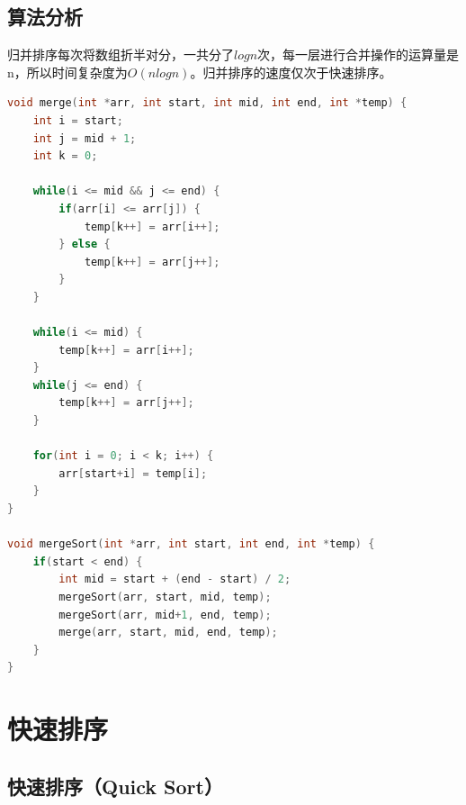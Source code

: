 \subsection{算法分析}

归并排序每次将数组折半对分，一共分了$ logn $次，每一层进行合并操作的运算量是n，所以时间复杂度为$ O(nlogn) $。归并排序的速度仅次于快速排序。 \\

\begin{table}[H]
    \centering
    \caption{归并排序算法分析}
\end{table}


\begin{lstlisting}[language=C]
void merge(int *arr, int start, int mid, int end, int *temp) {
    int i = start;
    int j = mid + 1;
    int k = 0;

    while(i <= mid && j <= end) {
        if(arr[i] <= arr[j]) {
            temp[k++] = arr[i++];
        } else {
            temp[k++] = arr[j++];
        }
    }

    while(i <= mid) {
        temp[k++] = arr[i++];
    }
    while(j <= end) {
        temp[k++] = arr[j++];
    }

    for(int i = 0; i < k; i++) {
        arr[start+i] = temp[i];
    }
}

void mergeSort(int *arr, int start, int end, int *temp) {
    if(start < end) {
        int mid = start + (end - start) / 2;
        mergeSort(arr, start, mid, temp);
        mergeSort(arr, mid+1, end, temp);
        merge(arr, start, mid, end, temp);
    }
}
\end{lstlisting}

\newpage

\section{快速排序}

\subsection{快速排序（Quick Sort）}

